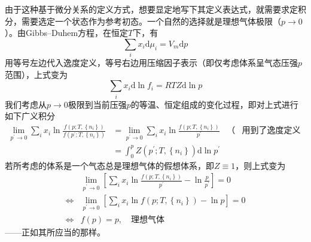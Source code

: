\documentclass[main.tex]{subfiles}
\begin{document}
由于这种基于微分关系的定义方式，想要显定地写下其定义表达式，就需要求定积分，需要选定一个状态作为参考初态。一个自然的选择就是理想气体极限（$p\rightarrow 0$）。由Gibbs--Duhem方程，在恒定$T$下，有
\[\sum_i x_i\mathrm{d}\mu_i=V_m\mathrm{d}p\]
用等号左边代入逸度定义，等号右边用压缩因子表示（即仅考虑体系呈气态压强$p$范围），上式变为
\[\sum_i x_i\mathrm{d}\ln f_i=RTZ\mathrm{d}\ln p\]
我们考虑从$p\rightarrow 0$极限到当前压强$p$的等温、恒定组成的变化过程，即对上式进行如下广义积分
\begin{align*}
    \lim_{p^\prime\to 0}\sum_ix_i\ln\frac{f\left(p;T,\left\{n_i\right\}\right)}{f\left(p^\prime;T,\left\{n_i\right\}\right)} & =\lim_{p^\prime\to 0}\sum_ix_i\ln\frac{f\left(p;T,\left\{n_i\right\}\right)}{p^\prime} & \text{（} & \text{用到了逸度定义的极限规定）} \\
                                                                                                                             & =\int_0^p Z\left(p^\prime;T,\left\{n_i\right\}\right)\mathrm{d}\ln p^\prime            &          &
\end{align*}
若所考虑的体系是一个气态总是理想气体的假想体系，即$Z\equiv 1$，则上式变为
\begin{align*}
                    & \lim_{p^\prime\to 0}\left[\sum_i x_i\ln\frac{f\left(p;T,\left\{n_i\right\}\right)}{p^\prime}-\ln\frac{p}{p^\prime}\right]=0 \\
    \Leftrightarrow & \lim_{p^\prime\to 0}\left[\sum_ix_i\ln f\left(p;T,\left\{n_i\right\}\right)-\ln p\right]=0                                  \\
    \Leftrightarrow & f\left(p\right)=p,\quad\text{理想气体}
\end{align*}
——正如其所应当的那样。
\end{document}
